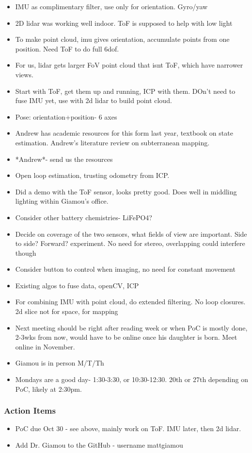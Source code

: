 \begin{itemize}
				\item IMU as complimentary filter, use only for orientation. Gyro/yaw
				\item 2D lidar was working well indoor. ToF is supposed to help with low light
				\item To make point cloud, imu gives orientation, accumulate points from one position. Need ToF to do full 6dof.
				\item For us, lidar gets larger FoV point cloud that isnt ToF, which have narrower views.
				\item Start with ToF, get them up and running, ICP with them. DOn't need to fuse IMU yet, use with 2d lidar to build point cloud.
				\item Pose: orientation+position- 6 axes
				\item Andrew has academic resources for this form last year, textbook on state estimation. Andrew's literature review on subterranean mapping.
				\item *Andrew*- send us the resources
				\item Open loop estimation, trusting odometry from ICP.
				\item Did a demo with the ToF sensor, looks pretty good. Does well in middling lighting within Giamou's office.
				\item Consider other battery chemistries- LiFePO4?
				\item Decide on coverage of the two sensors, what fields of view are important. Side to side? Forward? experiment. No need for stereo, overlapping could interfere though
				\item Consider button to control when imaging, no need for constant movement
				\item Existing algos to fuse data, openCV, ICP
				\item For combining IMU with point cloud, do extended filtering. No loop closures. 2d slice not for space, for mapping
				\item Next meeting should be right after reading week or when PoC is mostly done, 2-3wks from now, would have to be online once his daughter is born. Meet online in November.
				\item Giamou is in person M/T/Th
				\item Mondays are a good day- 1:30-3:30, or 10:30-12:30. 20th or 27th depending on PoC, likely at 2:30pm.
			\end{itemize}

		\subsubsection*{Action Items}
			\begin{itemize}
				\item PoC due Oct 30 - see above, mainly work on ToF. IMU later, then 2d lidar.
				\item Add Dr. Giamou to the GitHub - username mattgiamou
			\end{itemize}


